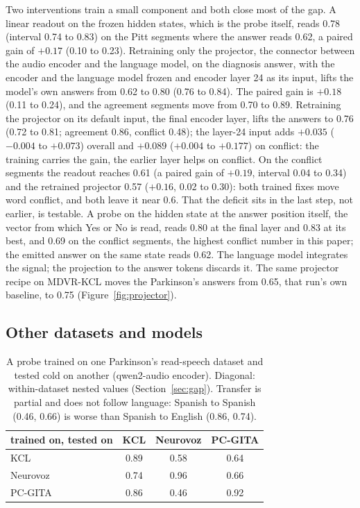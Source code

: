 \documentclass[conference]{IEEEtran}
\begin{document}
Two interventions train a small component and both close most of the gap. A linear readout on the
frozen hidden states, which is the probe itself, reads 0.78 (interval 0.74 to 0.83) on the Pitt
segments where the answer reads 0.62, a paired gain of $+0.17$ (0.10 to 0.23). Retraining only the
projector, the connector between the audio encoder and the language model, on the diagnosis
answer, with the encoder and the language model frozen and encoder layer 24 as its input, lifts the
model's own answers from 0.62 to 0.80 (0.76 to 0.84). The paired gain is $+0.18$ (0.11 to 0.24), and
the agreement segments move from 0.70 to 0.89. Retraining the projector on its default input, the final
encoder layer, lifts the answers to 0.76 (0.72 to 0.81; agreement 0.86, conflict 0.48); the layer-24
input adds $+0.035$ ($-0.004$ to $+0.073$) overall and $+0.089$ ($+0.004$ to $+0.177$) on conflict:
the training carries the gain, the earlier layer helps on conflict. On the conflict segments the
readout reaches 0.61 (a
paired gain of $+0.19$, interval 0.04 to 0.34) and the retrained projector 0.57 ($+0.16$, 0.02 to
0.30): both trained fixes move word conflict, and both leave it near 0.6. That the deficit sits in the last step, not earlier, is testable. A probe on the hidden
state at the answer position itself, the vector from which Yes or No is read, reads 0.80 at the final
layer and 0.83 at its best, and 0.69 on the conflict segments, the highest conflict number in this
paper; the emitted answer on the same state reads 0.62. The language model integrates the signal; the
projection to the answer tokens discards it. The same projector recipe on MDVR-KCL moves the Parkinson's answers from 0.65, that run's own
baseline, to 0.75 (Figure~\ref{fig:projector}).

\subsection{Other datasets and models}

\begin{table}[t]
\centering\small
\caption{A probe trained on one Parkinson's read-speech dataset and tested cold on another
(qwen2-audio encoder). Diagonal: within-dataset nested values (Section~\ref{sec:gap}). Transfer is
partial and does not follow language: Spanish to Spanish (0.46, 0.66) is worse than Spanish to
English (0.86, 0.74).}
\label{tab:cross}
\begin{tabular}{@{}lccc@{}}
\toprule
trained on, tested on & KCL & Neurovoz & PC-GITA \\
\midrule
KCL       & 0.89 & 0.58 & 0.64 \\
Neurovoz  & 0.74 & 0.96 & 0.66 \\
PC-GITA   & 0.86 & 0.46 & 0.92 \\
\bottomrule
\end{tabular}
\end{table}
\end{document}
